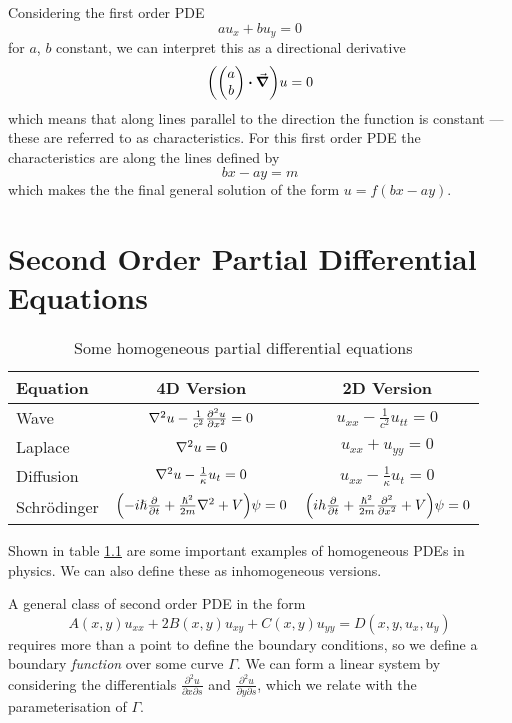 \documentclass[a4paper,12pt,parskip=full,BCOR=1cm]{scrreprt}
\begin{document}
Considering the first order PDE
\begin{equation*}
 au_x + b u_y = 0
\end{equation*}
for $a$, $b$ constant, we can interpret this as a directional derivative
\begin{equation*}
 \qty(\pmqty{a\\b} \vdot \grad)u = 0
\end{equation*} which means that along lines parallel to the direction the function is constant --- these are referred to as characteristics.
For this first order PDE the characteristics are along the lines defined by
$$bx-ay=m$$ which makes the the final general solution of the form $u=f(bx-ay)$.
\chapter{Second Order Partial Differential Equations}
\begin{table}[htbp]
 \centering
 \begin{tabular}{l c c}
  \toprule
  Equation      & 4D Version                                                             & 2D Version                                                   \\
  \midrule
  Wave          & $\laplacian u - \frac{1}{c^2}\pdv[2]{u}{x}=0$                          & $u_{xx} - \frac{1}{c^2}u_{tt}=0$                             \\
  Laplace       & $\laplacian u = 0$                                                     & $u_{xx} + u_{yy} = 0$                                        \\
  Diffusion     & $\laplacian u - \frac{1}{\kappa} u_t = 0$                              & $u_{xx} - \frac{1}{\kappa} u_t = 0 $                         \\
  Schr\"odinger & $\qty(-i\hslash \pdv{t} + \frac{\hslash^2}{2m}\laplacian + V)\psi = 0$ & $\qty(ih\pdv{t} + \frac{\hslash^2}{2m}\pdv[2]{x} + V)\psi=0$ \\\bottomrule
 \end{tabular}
 \caption{Some homogeneous partial differential equations}\label{tbl:homogenouspde}
\end{table}

Shown in table \ref{tbl:homogenouspde} are some important examples of homogeneous PDEs in physics.
We can also define these as inhomogeneous versions.

A general class of second order PDE in the form $$A(x,y)u_{xx} + 2B(x,y)u_{xy} + C(x,y)u_{yy} = D(x,y,u_x,u_y)$$
requires more than a point to define the boundary conditions, so we define a boundary \emph{function} over some curve $\Gamma$.
We can form a linear system by considering the differentials $\frac{\partial^2 u}{\partial x \partial s}$ and $\frac{\partial^2 u}{\partial y \partial s}$, which we relate with the parameterisation of $\Gamma$.
\end{document}
